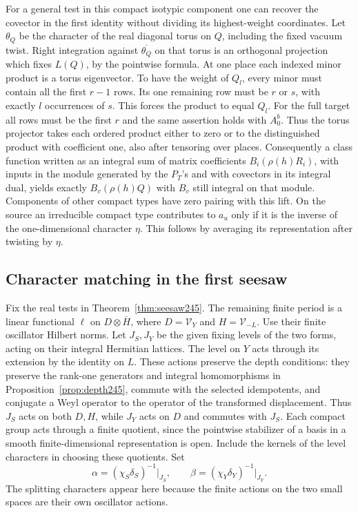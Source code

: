 \documentclass[a4paper,11pt]{article}
\theoremstyle{definition}
\theoremstyle{remark}
\numberwithin{equation}{section}
\begin{document}
For a general test in this compact isotypic component one can recover
the covector in the first identity without dividing its highest-weight
coordinates. Let \(\theta_Q\) be the character of the real diagonal
torus on \(Q\), including the fixed vacuum twist. Right integration
against \(\overline{\theta_Q}\) on that torus is an orthogonal
projection which fixes \(L(Q)\), by the pointwise formula. At one
place each indexed minor product is a torus eigenvector. To have the
weight of \(Q_l\), every minor must contain all the first \(r-1\)
rows. Its one remaining row must be \(r\) or \(s\), with exactly
\(l\) occurrences of \(s\). This forces the product to equal \(Q_l\).
For the full target all rows must be the first \(r\) and the same
assertion holds with \(A_0^b\). Thus the torus projector takes each
ordered product either to zero or to the distinguished product with
coefficient one, also after tensoring over places. Consequently a
class function written as an integral sum of matrix coefficients
\(B_i(\rho(h)R_i)\), with inputs in the module generated by the
\(P_T\)'s and with covectors in its integral dual, yields exactly
\(B_v(\rho(h)Q)\) with \(B_v\) still integral on that module.
Components of other compact types have zero pairing with this lift.
On the source an irreducible compact type contributes to \(a_u\)
only if it is the inverse of the one-dimensional character \(\eta\).
This follows by averaging its representation after twisting by \(\eta\).

\subsection{Character matching in the first seesaw}\label{nav:VII-37}
Fix the real tests in Theorem~\ref{thm:seesaw245}. The remaining
finite period is a linear functional \(\ell\) on
\(D\otimes\overline H\), where \(D=\mathcal V_Y\) and
\(H=\mathcal V_{-L}\). Use their finite oscillator Hilbert norms.
Let \(J_S,J_Y\) be the given fixing levels of the two forms, acting
on their integral Hermitian lattices. The level on \(Y\) acts
through its extension by the identity on \(L\). These actions
preserve the depth conditions: they preserve the rank-one
generators and integral homomorphisms in Proposition~\ref{prop:depth245},
commute with the selected idempotents, and conjugate a Weyl operator
to the operator of the transformed displacement. Thus \(J_S\) acts
on both \(D,H\), while \(J_Y\) acts on \(D\) and commutes with
\(J_S\). Each compact group acts through a finite quotient, since
the pointwise stabilizer of a basis in a smooth finite-dimensional
representation is open. Include the kernels of the level characters
in choosing these quotients. Set
\[
        \alpha=(\chi_S\delta_S)^{-1}\big|_{J_S},\qquad
        \beta=(\chi_Y\delta_Y)^{-1}\big|_{J_Y}.
\]
The splitting characters appear here because the finite actions
on the two small spaces are their own oscillator actions.
\end{document}
